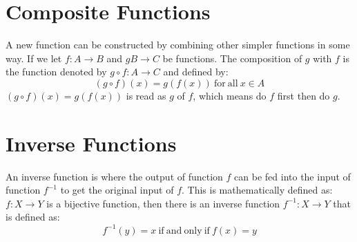 \section{Composite Functions}
A new function can be constructed by combining other simpler functions in some way. If we let $f: A \rightarrow B$ and $g B \rightarrow C$ be functions. The composition of $g$ with $f$ is the function denoted by $g \circ f: A \rightarrow C$ and defined by:
\[(g\circ f) (x) = g(f(x)) \mathrm{\ for\ all\ } x\in A\]
$(g\circ f) (x) = g(f(x))$ is read as $g$ of $f$, which means do $f$ first then do $g$. 

\section{Inverse Functions}
An inverse function is where the output of function $f$ can be fed into the input of function $f^{-1}$ to get the original input of $f$. This is mathematically defined as: $f: X \rightarrow Y$ is a bijective function, then there is an inverse function $f^{-1}: X \rightarrow Y$ that is defined as:
\[f^{-1} (y) = x \mathrm{\ if\ and\ only\ if\ } f(x) = y \]
